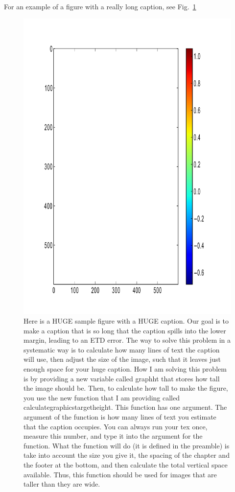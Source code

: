 For an example of a figure with a really long caption, see Fig.~\ref{fig:longcap}
\begin{figure}[hbtp]
\centering
{}
\includegraphics[height=\graphht]{Chapter-2/figs/color_stretched}
\caption{Here is a HUGE sample figure with a HUGE caption. Our goal is to make a caption that is so long that the caption spills into the lower margin, leading to an ETD error. The way to solve this problem in a systematic way is to calculate how many lines of text the caption will use, then adjust the size of the image, such that it leaves just enough space for your huge caption. How I am solving this problem is by providing a new variable called graphht that stores how tall the image should be. Then, to calculate how tall to make the figure, you use the new function that I am providing called calculategraphicstargetheight. This function has one argument. The argument of the function is how many lines of text you estimate that the caption occupies. You can always run your tex once, measure this number, and type it into the argument for the function. What the function will do (it is defined in the preamble) is take into account the size you give it, the spacing of the chapter and the footer at the bottom, 
and then calculate the total vertical space available. Thus, this function should be used for images that are taller than they are wide.}
\label{fig:longcap}
\end{figure}
